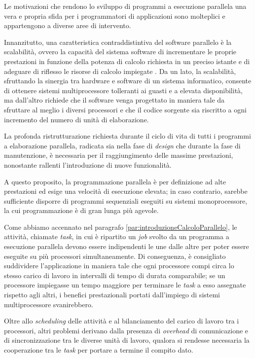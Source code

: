 Le motivazioni che rendono lo sviluppo di programmi a esecuzione parallela una vera e propria sfida per i programmatori
di applicazioni sono molteplici e appartengono a diverse aree di intervento.

Innanzitutto, una caratteristica contraddistintiva del software parallelo
\`e la scalabilit\`a, ovvero la capacit\`a del sistema software di incrementare le proprie prestazioni in funzione della potenza
di calcolo richiesta in un preciso istante e di adeguare di riflesso le risorse di calcolo impiegate \cite{Michael2007}.\newline
Da un lato, la scalabilit\`a, sfruttando la sinergia tra hardware e software di un sistema informatico, consente di ottenere
sistemi multiprocessore tolleranti ai guasti e a elevata disponibilit\`a, ma dall'altro richiede che il software venga progettato
in maniera tale da sfruttare al meglio i diversi processori e che il codice sorgente sia riscritto a ogni
incremento del numero di unit\`a di elaborazione.

La profonda ristrutturazione richiesta durante il ciclo di vita di tutti i  programmi a elaborazione parallela, radicata sia nella
fase di \textit{design} che durante la fase di manutenzione, \`e necessaria per il raggiungimento delle massime prestazioni, nonostante rallenti l'introduzione di nuove funzionalit\`a.

A questo proposito, la programmazione parallela \`e per definizione ad alte prestazioni ed esige una
velocit\`a di esecuzione elevata; in caso contrario, sarebbe sufficiente disporre di programmi sequenziali eseguiti su sistemi monoprocessore, la cui programmazione \`e di gran lunga pi\`u agevole.

Come abbiamo accennato nel paragrafo \ref{par:introduzioneCalcoloParallelo}, le attivit\`a, chiamate \textit{task}, in cui \`e ripartito un \textit{job} svolto da un
programma a esecuzione parallela devono essere indipendenti le une dalle altre per poter essere eseguite su pi\`u processori simultaneamente.\newline
Di conseguenza, \`e consigliato suddividere l'applicazione in maniera tale che ogni processore compi circa lo stesso carico di lavoro in intervalli
di tempo di durata comparabile; se un processore impiegasse un tempo maggiore per terminare le \textit{task} a esso assegnate rispetto agli altri, i benefici prestazionali portati
dall'impiego di sistemi multiprocessore svanirebbero.

Oltre allo \textit{scheduling} delle attivit\`a e al bilanciamento del carico di lavoro tra i processori, altri problemi derivano dalla presenza di
\textit{overhead} di comunicazione e di sincronizzazione tra le diverse unit\`a di lavoro, qualora si rendesse necessaria la cooperazione tra le
\textit{task} per portare a termine il compito dato.

